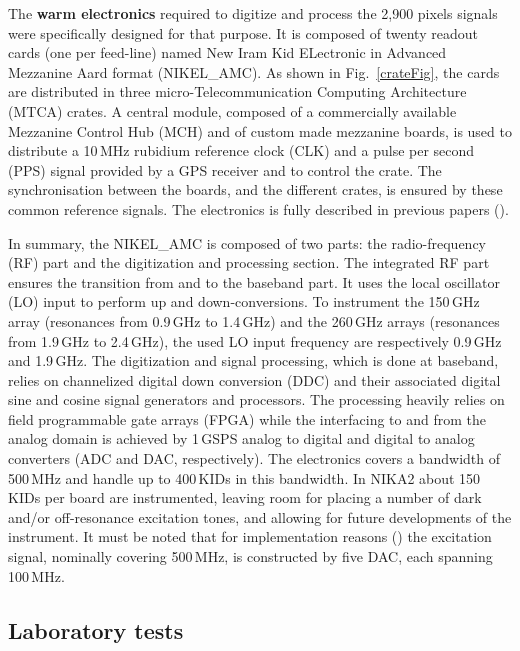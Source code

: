 \documentclass[]{aa} %
\begin{document}
The \textbf{warm electronics} required to digitize and process the 2,900 pixels signals were specifically designed for that purpose.
It is composed of twenty readout cards (one per feed-line) named New Iram Kid ELectronic in Advanced Mezzanine Aard format (NIKEL\_AMC).
As shown in Fig.~\ref{crateFig}, the cards are distributed in three micro-Telecommunication Computing Architecture (MTCA) crates.
A central module, composed of a commercially available Mezzanine Control Hub (MCH) and of custom made mezzanine boards, is used to distribute a 10\,MHz rubidium reference clock (CLK) and a pulse per second (PPS) signal provided by a GPS receiver and to control the crate. The synchronisation between the boards, and the different crates, is ensured by these common reference signals. The electronics is fully described in previous papers (\cite{Bourrion2012,Bourrion2016}).

In summary, the NIKEL\_AMC is composed of two parts: the radio-frequency (RF) part and the digitization and processing section.
The integrated RF part ensures the transition from and to the baseband part.
It uses the local oscillator (LO) input to perform up and down-conversions.
To instrument the 150\,GHz array (resonances from 0.9\,GHz to 1.4\,GHz) and the 260\,GHz arrays (resonances from 1.9\,GHz to 2.4\,GHz), the used LO input frequency are respectively 0.9\,GHz and 1.9\,GHz. The digitization and signal processing, which is done at baseband, relies on channelized digital down conversion (DDC) and their associated digital sine and cosine signal generators and processors.
The processing heavily relies on field programmable gate arrays (FPGA) while the interfacing to and from the analog domain is achieved by 1\,GSPS analog to digital and digital to analog converters (ADC and DAC, respectively).
The electronics covers a bandwidth of 500\,MHz and handle up to 400\,KIDs in this bandwidth. In NIKA2 about 150 KIDs per board are instrumented, leaving room for placing a number of dark and/or off-resonance excitation tones, and allowing for future developments of the instrument. 
It must be noted that for implementation reasons (\cite{Bourrion2012,Bourrion2016}) the excitation signal, nominally covering 500\,MHz, is constructed by five DAC, each spanning 100\,MHz.

\subsection{Laboratory tests}
\label{Laboratory tests}
\end{document}
